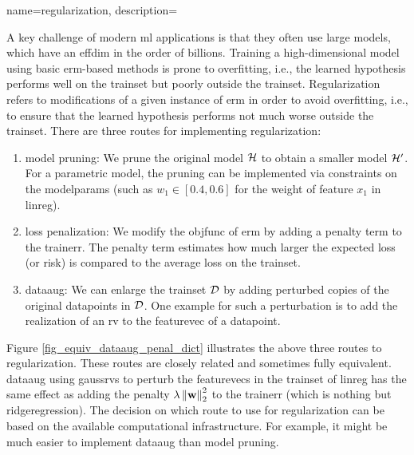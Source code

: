 {name={regularization}, 
  description={A key challenge of modern \gls{ml} applications 
  	    is that they often use large \glspl{model}, which have an \gls{effdim} in the order 
  	    of billions. Training a high-dimensional \gls{model} using basic \gls{erm}-based 
  	    methods is prone to \gls{overfitting}, i.e., the learned \gls{hypothesis} performs 
  	    well on the \gls{trainset} but poorly outside the \gls{trainset}. Regularization refers 
  	    to modifications of a given instance of \gls{erm} in order to avoid \gls{overfitting}, 
  	    i.e., to ensure that the learned \gls{hypothesis} performs not much worse outside 
  	    the \gls{trainset}. There are three routes for implementing regularization: 
		\begin{enumerate}[label=\arabic*)]
			\item {\Gls{model} pruning:} We prune the original \gls{model} $\mathcal{H}$ to obtain a 
			smaller \gls{model} $\mathcal{H}'$. For a parametric \gls{model}, the pruning can be 
			implemented via constraints on the \gls{modelparams} (such as $w_{1} \in [0.4,0.6]$ for 
			the weight of \gls{feature} $x_{1}$ in \gls{linreg}).
			\item {\Gls{loss} penalization:} We modify the \gls{objfunc} of \gls{erm} by adding a 
			penalty term to the \gls{trainerr}. The penalty term estimates how much larger the expected \gls{loss} (or \gls{risk}) 
			is compared to the average \gls{loss} on the \gls{trainset}. 
			\item {\Gls{dataaug}:} We can enlarge the \gls{trainset} $\mathcal{D}$ by adding 
			perturbed copies of the original \glspl{datapoint} in $\mathcal{D}$. One example for such 
			a perturbation is to add the \gls{realization} of an \gls{rv} to the \gls{featurevec} 
			of a \gls{datapoint}. 
		\end{enumerate} 
		Figure \ref{fig_equiv_dataaug_penal_dict} illustrates the above three routes to regularization. 
		These routes are closely related and sometimes fully equivalent. \Gls{dataaug} using \glspl{gaussrv} 
		to perturb the \glspl{featurevec} in the \gls{trainset} of \gls{linreg} 
		has the same effect as adding the penalty 
		$\lambda \left\Vert {{\bf w}} \right\Vert_{2}^2$ to the \gls{trainerr} (which is nothing but \gls{ridgeregression}). 
        The decision on which route to use for regularization can be based on the 
        available computational infrastructure. For example, it might be much easier to 
        implement \gls{dataaug} than \gls{model} pruning. 
		\begin{figure}[H]

\end{figure}}}
